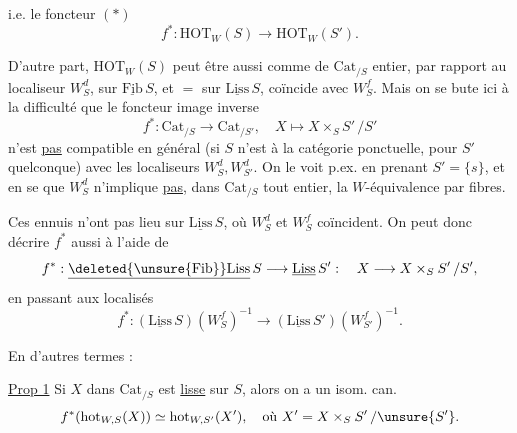 i.e. le foncteur $(*)$
\[
f^*:\mathrm{HOT}_W(S)\longrightarrow\mathrm{HOT}_W(S').
\]

D'autre part, $\mathrm{HOT}_W(S)$ peut être  aussi comme  de $\mathrm{Cat}_{/S}$  entier, par rapport au localiseur $W_S^d$,  sur $\underline{\mathrm{Fib}}\,S$, et $=$ sur $\underline{\mathrm{Liss}}\,S$, coïncide avec $W_S^f$. Mais on se bute ici à la difficulté que le foncteur image inverse
\[
f^*:\mathrm{Cat}_{/S}\longrightarrow\mathrm{Cat}_{/S'},\quad X\longmapsto X\times_S S'\,/S'
\]
n'est \uline{pas} compatible en général (si $S$ n'est  à la catégorie ponctuelle, pour $S'$ quelconque) avec les localiseurs $W_S^d,W_{S'}^d$. On le voit p.ex. en prenant $S'=\{s\}$, et en se  que $W_S^d$ n'implique \uline{pas}, dans $\mathrm{Cat}_{/S}$ tout entier, la $W$-équivalence par fibres.

Ces ennuis n'ont pas lieu sur $\underline{\mathrm{Liss}}\,S$, où $W_S^d$ et $W_S^f$ coïncident. On peut donc décrire $f^*$  aussi à l'aide de
\[
f^*:\underline{\deleted{\unsure{\mathrm{Fib}}}\mathrm{Liss}}\,S\longrightarrow\underline{\mathrm{Liss}}\,S':\quad X\longrightarrow X\times_S S'\,/S',
\]
en passant aux localisés
\[
f^*:(\underline{\mathrm{Liss}}\,S)(W_S^f)^{-1}\longrightarrow(\underline{\mathrm{Liss}}\,S')(W_{S'}^f)^{-1}.
\]

En d'autres termes :

\uline{Prop 1} Si $X$ dans $\mathrm{Cat}_{/S}$ est \uline{lisse} sur $S$, alors on a un isom. can.
\[
f^*(\mathrm{hot}_{W,S}(X))\simeq\mathrm{hot}_{W,S'}(X'),\quad\text{où }X'=X\times_S S'\,/\unsure{S'}.
\]
